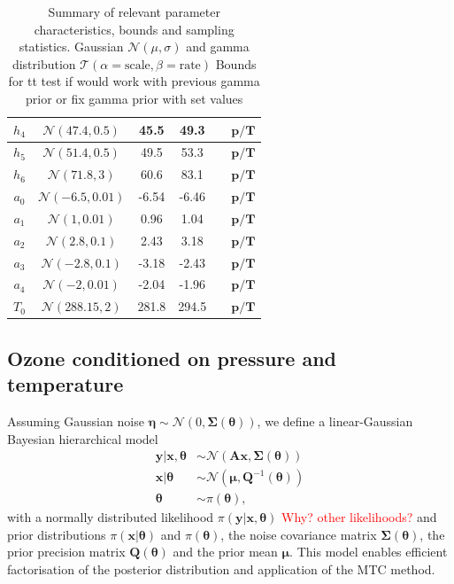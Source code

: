 \begin{table}
\begin{tabular}{ |c||c|c|c|c|c|   }
		$h_{4}$ &  $\mathcal{N}(47.4,0.5)$&45.5 &49.3&&$\bm{p/T}$\\ \hline
		$h_{5}$ &  $\mathcal{N}(51.4,0.5)$&49.5 &53.3&&$\bm{p/T}$\\ \hline
		$h_{6}$ &  $\mathcal{N}(71.8,3)$&60.6 &83.1&&$\bm{p/T}$\\ \hline
		$a_{0}$ &  $\mathcal{N}(-6.5,0.01)$&-6.54 &-6.46&&$\bm{p/T}$\\ \hline
		$a_{1}$ &  $\mathcal{N}(1,0.01)$&0.96 &1.04&&$\bm{p/T}$\\ \hline
		$a_{2}$ &  $\mathcal{N}(2.8,0.1)$&2.43 &3.18&&$\bm{p/T}$\\ \hline
		$a_{3}$ &  $\mathcal{N}(-2.8,0.1)$&-3.18 &-2.43&&$\bm{p/T}$\\ \hline
		$a_{4}$ & $\mathcal{N}(-2,0.01)$ &-2.04 &-1.96&&$\bm{p/T}$\\ \hline
		$T_{0}$ &  $\mathcal{N}(288.15,2)$& 281.8 &294.5&&$\bm{p/T}$\\
		\hline
	\end{tabular}
	\caption[Summary of relevant parameter characteristics, bounds and sampling statistics.]{Summary of relevant parameter characteristics, bounds and sampling statistics. Gaussian $\mathcal{N}(\mu,\sigma)$ and gamma distribution $\mathcal{T}(\alpha = \text{scale}, \beta = \text{rate})$
		Bounds for tt test if would work with previous gamma prior or fix gamma prior with set values}
	\label{tab:priors}
\end{table}

\subsection{Ozone conditioned on pressure and temperature}
Assuming Gaussian noise $\bm{\eta} \sim \mathcal{N}(0, \bm{\Sigma}(\bm{\theta}))$, we define a linear-Gaussian Bayesian hierarchical model~\cite{fox2016fast}
\begin{subequations}
	\begin{align}
		\bm{y} |  \bm{x}, \bm{\theta} &\sim \mathcal{N}(\bm{A} \bm{x}, \bm{\Sigma}(\bm{\theta})) \label{eq:likelihood} \\
		\bm{x} |  \bm{\theta} &\sim \mathcal{N}(\bm{\mu}, \bm{Q}^{-1}(\bm{\theta})) \label{eq:xPrior} \\
		\bm{\theta} &\sim \pi(\bm{\theta}) \label{eq:gammaPrior},
	\end{align}
	\label{eq:BayMode}
\end{subequations}
with a normally distributed likelihood $\pi(\bm{y} |  \bm{x}, \bm{\theta})$ \textcolor{red}{Why? other likelihoods?} and prior distributions $\pi(\bm{x} |  \bm{\theta})$ and $\pi(\bm{\theta})$, the noise covariance matrix $\bm{\Sigma}(\bm{\theta})$, the prior precision matrix $\bm{Q}(\bm{\theta})$ and the prior mean $\bm{\mu}$.
This model enables efficient factorisation of the posterior distribution and application of the MTC method.



